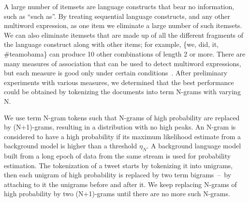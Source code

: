 \documentclass{sig-alternate}
\begin{document}
A large number of itemsets are language constructs that bear no information,
such as ``such as''. 
By treating sequential language constructs, and any other multiword expression,
as one item we eliminate a large number of such itemsets.
We can also eliminate itemsets that are made up of all the different fragments
of the language construct along with other items;
for example, \{we, did, it, \#teamobama\} can produce 10 other combinations of
length 2 or more.
There are many measures of association that can be used to detect multiword
expressions, but each measure is good only under certain conditions~\cite{ramisch2012broad,tan2002selecting}.
After preliminary experiments with various measures, we determined that
the best performance
could be obtained by tokenizing the documents into term N-grams with varying N. 

We use term N-gram tokens such that N-grams of high probability are replaced by
(N+1)-grams, resulting in a distribution with no high peaks.  
An N-gram is considered to %
have a high probability if its maximum likelihood estimate from a background
model is higher than a threshold $\eta_N$. 
A background language model built from a long epoch of data 
from the same stream is used for probability estimation.
The tokenization of a tweet starts by tokenizing it into unigrams, then each
unigram of high probability is replaced by two term bigrams~--~by
attaching to it the unigrams before and after it.
We keep replacing N-grams of high probability by two (N+1)-grams 
until there are no more such N-grams. %

\end{document}
